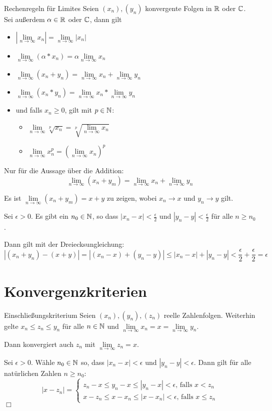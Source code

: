 \begin{satz}{Rechenregeln für Limites}
	Seien $(x_n), (y_n)$ konvergente Folgen in $\mathbb{R}$ oder $\mathbb{C}$. Sei außerdem $\alpha\in\mathbb{R}$ oder $\mathbb{C}$, dann gilt

	\begin{itemize}
		\item $\left|\lim\limits_{n\to\infty}x_n\right|=\lim\limits_{n\to\infty}|x_n|$
		\item $\lim\limits_{n\to\infty}(\alpha * x_n) = \alpha \lim\limits_{n\to\infty}x_n$
		\item $\lim\limits_{n\to\infty}(x_n+y_n)=\lim\limits_{n\to\infty}x_n+\lim\limits_{n\to\infty}y_n$
		\item $\lim\limits_{n\to\infty}(x_n*y_n)=\lim\limits_{n\to\infty}x_n*\lim\limits_{n\to\infty}y_n$
		\item und falls $x_n\geq 0$, gilt mit $p\in\mathbb{N}$:
		\begin{itemize}
			\item $ \lim\limits_{n\to\infty}\sqrt[p]{x_n}=\sqrt[p]{\lim\limits_{n\to\infty}x_n}$
			\item $\lim\limits_{n\to\infty}x_n^p = \left(\lim\limits_{n\to\infty}x_n\right)^p$
		\end{itemize}
	\end{itemize}
\end{satz}
\beweis
Nur für die Aussage über die Addition:
$$\lim\limits_{n\to\infty}(x_n+y_m)=\lim\limits_{n\to\infty}x_n+\lim\limits_{n\to\infty}y_n$$

Es ist $\lim\limits_{n\to\infty}(x_n+y_m) = x+y$ zu zeigen, wobei $x_n\to x$ und $y_n\to y$ gilt.

Sei $\epsilon>0$. Es gibt ein $n_0\in\mathbb{N}$, so dass $|x_n-x|<\frac\epsilon2$ und $|y_n-y|<\frac\epsilon2$ für alle $n\geq n_0$.

Dann gilt mit der Dreiecksungleichung: $$\left|(x_n+y_n)-(x+y)\right|=\left|(x_n-x)+(y_n-y)\right|\leq |x_n-x|+|y_n-y|<\frac\epsilon2+\frac\epsilon2=\epsilon$$


\section{Konvergenzkriterien}
\begin{satz}{Einschließungskriterium}
	Seien $(x_n), (y_n), (z_n)$ reelle Zahlenfolgen. Weiterhin gelte $x_n\leq z_n\leq y_n$ für alle $n\in\mathbb{N}$ und $\lim\limits_{n\to\infty} x_n=x=\lim\limits_{n\to\infty} y_n$.

	Dann konvergiert auch $z_n$ mit $\lim\limits_{n\to\infty} z_n = x$.
\end{satz}
\beweis
Sei $\epsilon>0$. Wähle $n_0\in\mathbb{N}$ so, dass $|x_n-x|<\epsilon$ und $|y_n-y|<\epsilon$. Dann gilt für alle natürlichen Zahlen $n\geq n_0$:
\begin{equation*}
	|x-z_n|=\begin{cases}
		z_n-x\leq y_n-x \leq |y_n-x| <\epsilon \text{, falls $x<z_n$}\\
		x-z_n\leq x-x_n \leq |x-x_n| <\epsilon \text{, falls $x\leq z_n$}
	\end{cases}
\end{equation*}
\hfill $\Box$

